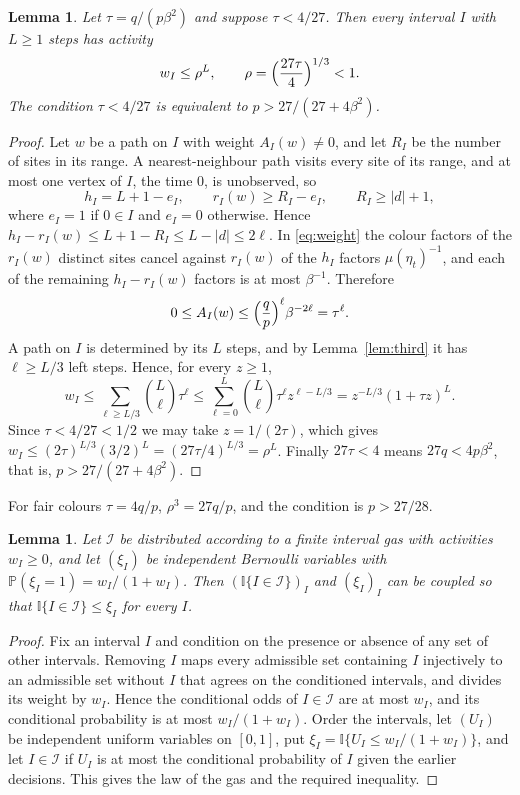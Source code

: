 \documentclass[11pt]{amsart}
\newtheorem{lemma}[theorem]{Lemma}
\theoremstyle{remark}
\newcommand{\PP}{\mathbb{P}}
\newcommand{\I}{\mathbb{I}}
\begin{document}
\begin{lemma}\label{lem:activity}
Let $\tau=q/(p\beta^2)$ and suppose $\tau<4/27$. Then every interval $I$ with $L\ge1$ steps has activity
\[
w_I\le\rho^L,\qquad \rho=\Bigl(\frac{27\tau}{4}\Bigr)^{1/3}<1 .
\]
The condition $\tau<4/27$ is equivalent to $p>27/(27+4\beta^2)$.
\end{lemma}

\begin{proof}
Let $w$ be a path on $I$ with weight $A_I(w)\ne0$, and let $R_I$ be the number of sites in its range. A
nearest-neighbour path visits every site of its range, and at most one vertex of $I$, the time $0$, is unobserved, so
\[
h_I=L+1-e_I,\qquad r_I(w)\ge R_I-e_I,\qquad R_I\ge|d|+1,
\]
where $e_I=1$ if $0\in I$ and $e_I=0$ otherwise. Hence $h_I-r_I(w)\le L+1-R_I\le L-|d|\le2\ell$. In
\eqref{eq:weight} the colour factors of the $r_I(w)$ distinct sites cancel against $r_I(w)$ of the $h_I$ factors
$\mu(\eta_t)^{-1}$, and each of the remaining $h_I-r_I(w)$ factors is at most $\beta^{-1}$. Therefore
\[
0\le A_I(w)\le\Bigl(\frac qp\Bigr)^{\ell}\beta^{-2\ell}=\tau^{\ell}.
\]
A path on $I$ is determined by its $L$ steps, and by Lemma~\ref{lem:third} it has $\ell\ge L/3$ left steps. Hence, for
every $z\ge1$,
\[
w_I\le\sum_{\ell\ge L/3}\binom L\ell\tau^{\ell}\le\sum_{\ell=0}^{L}\binom L\ell\tau^{\ell}z^{\ell-L/3}
=z^{-L/3}(1+\tau z)^L .
\]
Since $\tau<4/27<1/2$ we may take $z=1/(2\tau)$, which gives $w_I\le(2\tau)^{L/3}(3/2)^L=(27\tau/4)^{L/3}=\rho^L$.
Finally $27\tau<4$ means $27q<4p\beta^2$, that is, $p>27/(27+4\beta^2)$.
\end{proof}

For fair colours $\tau=4q/p$, $\rho^3=27q/p$, and the condition is $p>27/28$.

\begin{lemma}\label{lem:domination}
Let $\mathcal I$ be distributed according to a finite interval gas with activities $w_I\ge0$, and let $(\xi_I)$ be
independent Bernoulli variables with $\PP(\xi_I=1)=w_I/(1+w_I)$. Then $(\I\{I\in\mathcal I\})_I$ and $(\xi_I)_I$ can be
coupled so that $\I\{I\in\mathcal I\}\le\xi_I$ for every $I$.
\end{lemma}

\begin{proof}
Fix an interval $I$ and condition on the presence or absence of any set of other intervals. Removing $I$ maps every
admissible set containing $I$ injectively to an admissible set without $I$ that agrees on the conditioned intervals,
and divides its weight by $w_I$. Hence the conditional odds of $I\in\mathcal I$ are at most $w_I$, and its conditional
probability is at most $w_I/(1+w_I)$. Order the intervals, let $(U_I)$ be independent uniform variables on $[0,1]$, put
$\xi_I=\I\{U_I\le w_I/(1+w_I)\}$, and let $I\in\mathcal I$ if $U_I$ is at most the conditional probability of $I$ given
the earlier decisions. This gives the law of the gas and the required inequality.
\end{proof}
\end{document}
